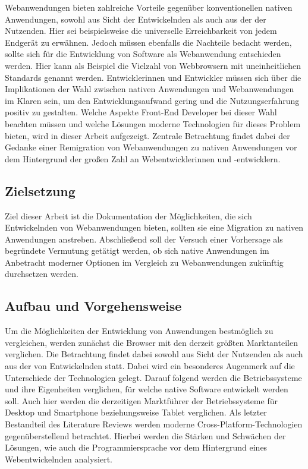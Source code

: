 \documentclass[a4paper]{scrartcl}
\begin{document}
Webanwendungen bieten zahlreiche Vorteile gegenüber konventionellen nativen Anwendungen, sowohl aus Sicht der Entwickelnden als auch aus der der Nutzenden. Hier sei beispielsweise die universelle Erreichbarkeit von jedem Endgerät zu erwähnen. Jedoch müssen ebenfalls die Nachteile bedacht werden, sollte sich für die Entwicklung von Software als Webanwendung entschieden werden. Hier kann als Beispiel die Vielzahl von Webbrowsern mit uneinheitlichen Standards genannt werden. Entwicklerinnen und Entwickler müssen sich über die Implikationen der Wahl zwischen nativen Anwendungen und Webanwendungen im Klaren sein, um den Entwicklungsaufwand gering und die Nutzungserfahrung positiv zu gestalten. Welche Aspekte Front-End Developer bei dieser Wahl beachten müssen und welche Lösungen moderne Technologien für dieses Problem bieten, wird in dieser Arbeit aufgezeigt. Zentrale Betrachtung findet dabei der Gedanke einer Remigration von Webanwendungen zu nativen Anwendungen vor dem Hintergrund der großen Zahl an Webentwicklerinnen und -entwicklern.

\newpage

\subsection{Zielsetzung}
Ziel dieser Arbeit ist die Dokumentation der Möglichkeiten, die sich Entwickelnden von Webanwendungen bieten, sollten sie eine Migration zu nativen Anwendungen anstreben. Abschließend soll der Versuch einer Vorhersage als begründete Vermutung getätigt werden, ob sich native Anwendungen im Anbetracht moderner Optionen im Vergleich zu Webanwendungen zukünftig durchsetzen werden. 

\newpage

\subsection{Aufbau und Vorgehensweise}
Um die Möglichkeiten der Entwicklung von Anwendungen bestmöglich zu vergleichen, werden zunächst die Browser mit den derzeit größten Marktanteilen verglichen. Die Betrachtung findet dabei sowohl aus Sicht der Nutzenden als auch aus der von Entwickelnden statt. Dabei wird ein besonderes Augenmerk auf die Unterschiede der Technologien gelegt. Darauf folgend werden die Betriebssysteme und ihre Eigenheiten verglichen, für welche native Software entwickelt werden soll. Auch hier werden die derzeitigen Marktführer der Betriebssysteme für Desktop und Smartphone beziehungsweise Tablet verglichen. Als letzter Bestandteil des Literature Reviews werden moderne Cross-Platform-Technologien gegenüberstellend betrachtet. Hierbei werden die Stärken und Schwächen der Lösungen, wie auch die Programmiersprache vor dem Hintergrund eines Webentwickelnden analysiert. \\
\end{document}
